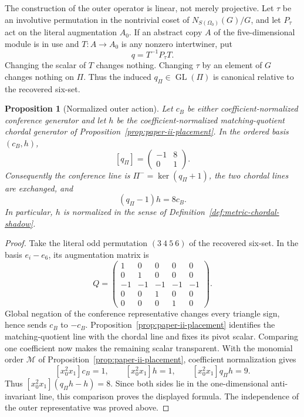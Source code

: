 \documentclass[11pt]{article}
\newtheorem{proposition}[theorem]{Proposition}
\theoremstyle{definition}
\theoremstyle{remark}
\begin{document}
The construction of the outer operator is linear, not merely projective.
Let \(\tau\) be an involutive permutation in the nontrivial coset of
\(N_{S(\Omega_0)}(G)/G\), and let \(P_\tau\) act on the literal augmentation
\(A_0\).  If an abstract copy \(A\) of the five-dimensional module is in use
and \(T:A\to A_0\) is any nonzero intertwiner, put
\[
                         q=T^{-1}P_\tau T.
\]
Changing the scalar of \(T\) changes nothing.  Changing \(\tau\) by an
element of \(G\) changes nothing on \(\Pi\).  Thus the induced
\(q_\Pi\in\operatorname{GL}(\Pi)\) is canonical relative to the recovered
six-set.

\begin{proposition}[Normalized outer action]
\label{prop:outer-pencil-action}
Let \(c_B\) be either coefficient-normalized conference generator and let
\(h\) be the coefficient-normalized matching-quotient chordal generator of
Proposition~\ref{prop:paper-ii-placement}.  In the
ordered basis \((c_B,h)\),
\[
              [q_\Pi]=\begin{pmatrix}-1&8\\0&1\end{pmatrix}.
\]
Consequently the conference line is \(\Pi^-=\ker(q_\Pi+1)\), the two chordal
lines are exchanged, and
\[
          (q_\Pi-1)h=8c_B.
\]
In particular, \(h\) is normalized in the sense of
Definition~\ref{def:metric-chordal-shadow}.
\end{proposition}

\begin{proof}
Take the literal odd permutation \((3\ 4\ 5\ 6)\) of the recovered six-set.
In the basis \(e_i-e_6\), its augmentation matrix is
\[
 Q=\begin{pmatrix}
 1&0&0&0&0\\
 0&1&0&0&0\\
 -1&-1&-1&-1&-1\\
 0&0&1&0&0\\
 0&0&0&1&0
 \end{pmatrix}.
\]
Global negation of the conference representative changes every triangle sign, hence sends
\(c_B\) to \(-c_B\).  Proposition~\ref{prop:paper-ii-placement} identifies
the matching-quotient line with the chordal line and fixes its pivot scalar.  Comparing one
coefficient now makes the remaining scalar transparent.  With the monomial
order \(\mathcal M\) of Proposition~\ref{prop:paper-ii-placement}, coefficient
normalization gives
\[
 [x_0^2x_1]c_B=1,\qquad [x_0^2x_1]h=1,\qquad
 [x_0^2x_1]q_\Pi h=9.
\]
Thus \([x_0^2x_1](q_\Pi h-h)=8\).  Since both sides lie in the
one-dimensional anti-invariant line, this comparison proves the displayed
formula.  The independence of the outer representative was proved above.
\end{proof}
\end{document}

